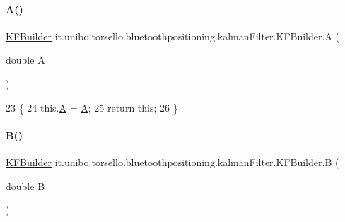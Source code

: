 \paragraph{\texorpdfstring{A()}{A()}}
{\footnotesize\ttfamily \hyperlink{classit_1_1unibo_1_1torsello_1_1bluetoothpositioning_1_1kalmanFilter_1_1KFBuilder}{K\+F\+Builder} it.\+unibo.\+torsello.\+bluetoothpositioning.\+kalman\+Filter.\+K\+F\+Builder.\+A (\begin{DoxyParamCaption}\item[{double}]{A }\end{DoxyParamCaption})}


\begin{DoxyCode}
23                                  \{
24         this.\hyperlink{classit_1_1unibo_1_1torsello_1_1bluetoothpositioning_1_1kalmanFilter_1_1KFBuilder_a89f12916414e352fc820a2c82fde76b8_a89f12916414e352fc820a2c82fde76b8}{A} = \hyperlink{classit_1_1unibo_1_1torsello_1_1bluetoothpositioning_1_1kalmanFilter_1_1KFBuilder_a89f12916414e352fc820a2c82fde76b8_a89f12916414e352fc820a2c82fde76b8}{A};
25         \textcolor{keywordflow}{return} \textcolor{keyword}{this};
26     \}
\end{DoxyCode}
\hypertarget{classit_1_1unibo_1_1torsello_1_1bluetoothpositioning_1_1kalmanFilter_1_1KFBuilder_aea73a0f86bc40ea3d240620d04f25df7_aea73a0f86bc40ea3d240620d04f25df7}{}\label{classit_1_1unibo_1_1torsello_1_1bluetoothpositioning_1_1kalmanFilter_1_1KFBuilder_aea73a0f86bc40ea3d240620d04f25df7_aea73a0f86bc40ea3d240620d04f25df7} 
\paragraph{\texorpdfstring{B()}{B()}}
{\footnotesize\ttfamily \hyperlink{classit_1_1unibo_1_1torsello_1_1bluetoothpositioning_1_1kalmanFilter_1_1KFBuilder}{K\+F\+Builder} it.\+unibo.\+torsello.\+bluetoothpositioning.\+kalman\+Filter.\+K\+F\+Builder.\+B (\begin{DoxyParamCaption}\item[{double}]{B }\end{DoxyParamCaption})}


